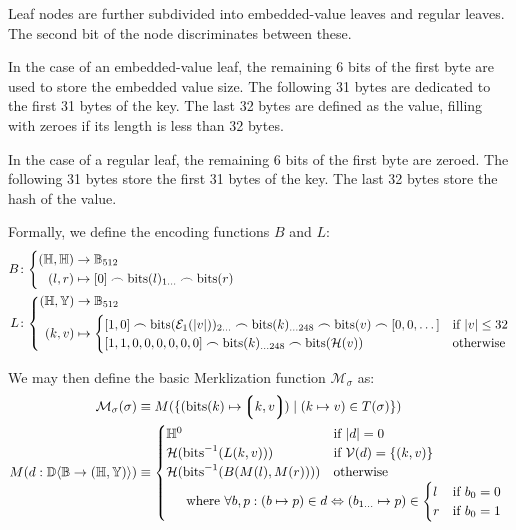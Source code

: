 Leaf nodes are further subdivided into embedded-value leaves and regular leaves. The second bit of the node discriminates between these.

In the case of an embedded-value leaf, the remaining 6 bits of the first byte are used to store the embedded value size. The following 31 bytes are dedicated to the first 31 bytes of the key. The last 32 bytes are defined as the value, filling with zeroes if its length is less than 32 bytes.

In the case of a regular leaf, the remaining 6 bits of the first byte are zeroed. The following 31 bytes store the first 31 bytes of the key. The last 32 bytes store the hash of the value.

Formally, we define the encoding functions $B$ and $L$:
\begin{align}
  B&\colon\left\{\begin{aligned}
    (\H, \H) &\to \mathbb{B}_{512}\\
    (l, r) &\mapsto [0] \frown \text{bits}(l)_{1\dots} \frown \text{bits}(r)
  \end{aligned}\right.\\
  L&\colon\left\{\begin{aligned}
    (\H, \Y) &\to \mathbb{B}_{512}\\
    (k, v) &\mapsto \begin{cases}
      [1, 0] \frown \text{bits}(\se_1(|v|))_{2\dots} \frown \text{bits}(k)_{\dots248} \frown \text{bits}(v) \frown [0, 0, \dots] &\when |v| \le 32\\
      [1, 1, 0, 0, 0, 0, 0, 0] \frown \text{bits}(k)_{\dots248} \frown \text{bits}(\mathcal{H}(v)) &\otherwise
    \end{cases}
  \end{aligned}\right.
\end{align}

We may then define the basic Merklization function $\mathcal{M}_\sigma$ as:
\begin{align}
  \mathcal{M}_\sigma(\sigma) &\equiv M(\{ (\text{bits}(k) \mapsto \tup{k, v}) \mid (k \mapsto v) \in T(\sigma) \})\\
  M(d: \dict{\mathbb{B}}{(\H, \Y)}) &\equiv \begin{cases}
    \H^0 &\when |d| = 0\\
    \mathcal{H}(\text{bits}^{-1}(L(k, v))) &\when \mathcal{V}(d) = \{ (k, v) \}\\
    \mathcal{H}(\text{bits}^{-1}(B(M(l), M(r)))) &\otherwise\\
    \multicolumn{2}{l}{\quad\where \forall b, p: (b \mapsto p) \in d \Leftrightarrow (b_{1\dots} \mapsto p) \in \begin{cases}
      l &\when b_0 = 0 \\
      r &\when b_0 = 1
    \end{cases}
  }\end{cases}
\end{align}

